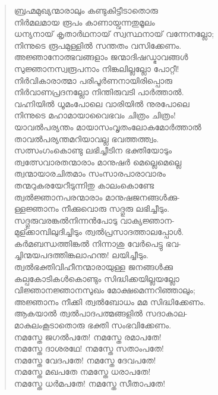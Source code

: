 \begin{verse}
ബ്രഹ്മമുഖ്യന്മാരാലും കണ്ടുകിട്ടീടാതൊരു\\
നിര്‍മലമായ രൂപം കാണായ്വന്നതുമൂലം\\
ധന്യനായ് കൃതാര്‍ഥനായ് സ്വസ്ഥനായ് വന്നേനല്ലോ;\\
നിന്നുടെ രൂപമുള്ളില്‍ സന്തതം വസിക്കേണം.\\
അജ്ഞാനോത്ഭവങ്ങളാം ജന്മാദിഷഡ്ഭാവങ്ങള്‍\\
സുജ്ഞാനസ്വരൂപനാം നിങ്കലില്ലല്ലോ പോറ്റീ!\\
നിര്‍വികാരാത്മാ പരിപൂര്‍ണനായിരിപ്പൊരു\\
നിര്‍വാണപ്രദനല്ലോ നിന്തിരുവടി പാര്‍ത്താല്‍.\\
വഹ്നിയില്‍ ധൂമംപോലെ വാരിയില്‍ നുരപോലെ\\
നിന്നുടെ മഹാമായാവൈഭവം ചിത്രം ചിത്രം!\\
യാവല്‍പര്യന്തം മായാസംവൃതംലോകമോര്‍ത്താല്‍\\
താവല്‍പര്യന്തമറിയാവല്ല ഭവത്തത്ത്വം.\\
സത്സംഗംകൊണ്ടു ലഭിച്ചീടിന ഭക്തിയോടും\\
ത്വത്സേവാരതന്മാരാം മാനുഷര്‍ മെല്ലെമെല്ലെ\\
ത്വന്മായാരചിതമാം സംസാരപാരാവാരം\\
തന്മറുകരയേറീടുന്നിതു കാലംകൊണ്ടേ\\
ത്വല്‍ജ്ഞാനപരന്മാരാം മാനുഷജനങ്ങള്‍ക്കു-\\
ള്ളജ്ഞാനം നീക്കുവൊരു സദ്ഗുരു ലഭിച്ചീടും.\\
സദ്ഗുരുവരങ്കല്‍നിന്നന്‍പോടു വാക്യജ്ഞാന-\\
മുള്ക്കാമ്പിലുദിച്ചിടും ത്വല്‍പ്രസാദത്താലപ്പോള്‍.\\
കര്‍മബന്ധത്തിങ്കല്‍ നിന്നാശു വേര്‍പെട്ടു ഭവ-\\
ച്ചിന്മയപദത്തിങ്കലാഹന്ത! ലയിച്ചീടും.\\
ത്വല്‍ഭക്തിവിഹീനന്മാരായുള്ള ജനങ്ങള്‍ക്കു\\
കല്പകോടികള്‍കൊണ്ടും സിദ്ധിക്കയില്ലയല്ലോ\\
വിജ്ഞാനജ്ഞാനസുഖം മോക്ഷമെന്നറിഞ്ഞാലും;\\
അജ്ഞാനം നീക്കി ത്വല്‍ബോധം മമ സിദ്ധിക്കേണം.\\
ആകയാല്‍ ത്വല്‍പാദപത്മങ്ങളില്‍ സദാകാല-\\
മാകുലംകൂടാതൊരു ഭക്തി സംഭവിക്കേണം.\\
നമസ്തേ ജഗല്‍പതേ! നമസ്തേ രമാപതേ!\\
നമസ്തേ ദാശരഥേ! നമസ്തേ സതാംപതേ!\\
നമസ്തേ വേദപതേ! നമസ്തേ ദേവപതേ!\\
നമസ്തേ മഖപതേ നമസ്തേ ധരാപതേ!\\
നമസ്തേ ധര്‍മപതേ! നമസ്തേ സീതാപതേ!\\

\end{verse}
